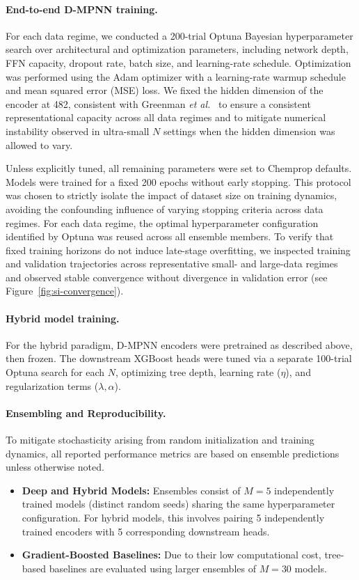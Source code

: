 \paragraph{End-to-end D-MPNN training.}
For each data regime, we conducted a 200-trial Optuna Bayesian hyperparameter search over architectural and optimization parameters, including network depth, FFN capacity, dropout rate, batch size, and learning-rate schedule. Optimization was performed using the Adam optimizer with a learning-rate warmup schedule and mean squared error (MSE) loss. We fixed the hidden dimension of the encoder at 482, consistent with Greenman \textit{et al.}~\cite{greenman2022multi} to ensure a consistent representational capacity across all data regimes and to mitigate numerical instability observed in ultra-small $N$ settings when the hidden dimension was allowed to vary.

Unless explicitly tuned, all remaining parameters were set to Chemprop defaults. Models were trained for a fixed 200 epochs without early stopping. This protocol was chosen to strictly isolate the impact of dataset size on training dynamics, avoiding the confounding influence of varying stopping criteria across data regimes. For each data regime, the optimal hyperparameter configuration identified by Optuna was reused across all ensemble members. To verify that fixed training horizons do not induce late-stage overfitting, we inspected training and validation trajectories across representative small- and large-data regimes and observed stable convergence without divergence in validation error (see Figure~\ref{fig:si-convergence}).

\paragraph{Hybrid model training.}
For the hybrid paradigm, D-MPNN encoders were pretrained as described above, then frozen. The downstream XGBoost heads were tuned via a separate 100-trial Optuna search for each $N$, optimizing tree depth, learning rate ($\eta$), and regularization terms ($\lambda, \alpha$).

\paragraph{Ensembling and Reproducibility.}
To mitigate stochasticity arising from random initialization and training dynamics, all reported performance metrics are based on ensemble predictions unless otherwise noted.
\begin{itemize}
\item \textbf{Deep and Hybrid Models:} Ensembles consist of $M=5$ independently trained models (distinct random seeds) sharing the same hyperparameter configuration. For hybrid models, this involves pairing 5 independently trained encoders with 5 corresponding downstream heads.
\item \textbf{Gradient-Boosted Baselines:} Due to their low computational cost, tree-based baselines are evaluated using larger ensembles of $M = 30$ models. 
\end{itemize}

